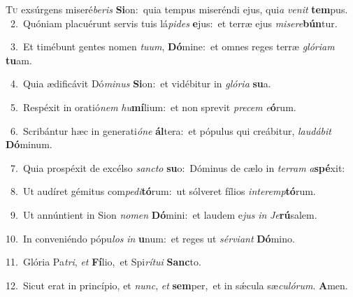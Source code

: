 \lettrine{\initial\textcolor{\initialcolor}{T}}{u} exsúrgens miseré\-\textit{be}\-\textit{ris} \textbf{Si}\-on:~\star quia tempus miseréndi ejus, qui\textit{a} \textit{ve}\-\textit{nit} \textbf{tem}\-pus.\\
{\numbfont\textcolor{\numbcolor}{~2.}}~Quóniam placuérunt servis tuis lá\-\textit{pi}\-\textit{des} \textbf{e}\-jus:~\star et terræ ejus \textit{mi}\-\textit{se}\textit{re}\textbf{bún}tur.\par
{\numbfont\textcolor{\numbcolor}{~3.}}~Et timébunt gentes nomen \textit{tu}\-\textit{um}, \textbf{Dó}\-mine:~\star et omnes reges terræ \textit{gló}\-\textit{ri}\textit{am} \textbf{tu}\-am.\par
{\numbfont\textcolor{\numbcolor}{~4.}}~Quia ædificávit Dó\-\textit{mi}\-\textit{nus} \textbf{Si}\-on:~\star et vidébitur in \textit{gló}\-\textit{ri}\textit{a} \textbf{su}\-a.\par
{\numbfont\textcolor{\numbcolor}{~5.}}~Respéxit in oratió\textit{nem} \textit{hu}\-\textbf{mí}lium:~\star et non sprevit \textit{pre}\-\textit{cem} \textit{e}\-\textbf{ó}rum.\par
{\numbfont\textcolor{\numbcolor}{~6.}}~Scribántur hæc in generati\-\textit{ó}\-\textit{ne} \textbf{ál}\-tera:~\star et pópulus qui creábitur, \textit{lau}\-\textit{dá}\textit{bit} \textbf{Dó}\-minum.\par
{\numbfont\textcolor{\numbcolor}{~7.}}~Quia prospéxit de excélso \textit{sanc}\-\textit{to} \textbf{su}\-o:~\star Dóminus de cælo in \textit{ter}\-\textit{ram} \textit{a}\-\textbf{spé}xit:\par
{\numbfont\textcolor{\numbcolor}{~8.}}~Ut audíret gémitus com\-\textit{pe}\-\textit{di}\textbf{tó}rum:~\star ut sólveret fílios \textit{in}\-\textit{ter}\textit{emp}\textbf{tó}rum.\par
{\numbfont\textcolor{\numbcolor}{~9.}}~Ut annúntient in Sion \textit{no}\-\textit{men} \textbf{Dó}\-mini:~\star et laudem e\textit{jus} \textit{in} \textit{Je}\-\textbf{rú}salem.\par
{\numbfont\textcolor{\numbcolor}{10.}}~In conveniéndo pópu\textit{los} \textit{in} \textbf{u}\-num:~\star et reges ut \textit{sér}\-\textit{vi}\textit{ant} \textbf{Dó}\-mino.\par
{\numbfont\textcolor{\numbcolor}{11.}}~Glória Pa\-\textit{tri}\-, \textit{et} \textbf{Fí}\-lio,~\star et Spi\-\textit{rí}\-\textit{tu}\textit{i} \textbf{Sanc}\-to.\par
{\numbfont\textcolor{\numbcolor}{12.}}~Sicut erat in princípio, et \textit{nunc}\-, \textit{et} \textbf{sem}\-per,~\star et in sǽcula sæ\-\textit{cu}\-\textit{ló}\textit{rum}. \textbf{A}\-men.\par
